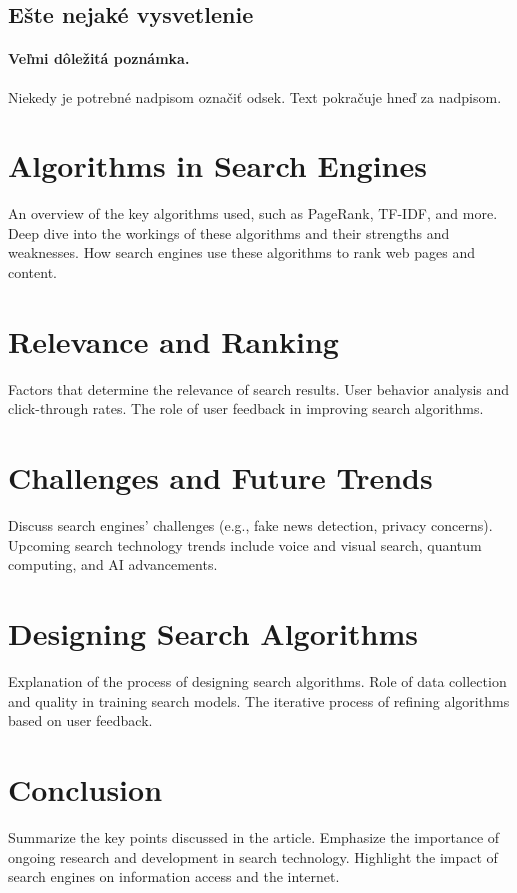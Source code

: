 \documentclass[14pt,twoside,slovak,a4paper]{coursepaper}
\begin{document}
\begin{multicols}{2}
\subsection{Ešte nejaké vysvetlenie} \label{ina:este}

\paragraph{Veľmi dôležitá poznámka.}
Niekedy je potrebné nadpisom označiť odsek. Text pokračuje hneď za nadpisom.



\section{Algorithms in Search Engines} \label{dolezita}
An overview of the key algorithms used, such as PageRank, TF-IDF, and more.
Deep dive into the workings of these algorithms and their strengths and weaknesses.
How search engines use these algorithms to rank web pages and content.



\section{Relevance and Ranking} \label{dolezitejsia}
Factors that determine the relevance of search results.
User behavior analysis and click-through rates.
The role of user feedback in improving search algorithms.

\section{Challenges and Future Trends}
Discuss search engines' challenges (e.g., fake news detection, privacy concerns).
Upcoming search technology trends include voice and visual search, quantum computing, and AI advancements.


\section{Designing Search Algorithms}
Explanation of the process of designing search algorithms.
Role of data collection and quality in training search models.
The iterative process of refining algorithms based on user feedback.

\section{Conclusion}
Summarize the key points discussed in the article.
Emphasize the importance of ongoing research and development in search technology.
Highlight the impact of search engines on information access and the internet.

\end{multicols} %





\end{document}

